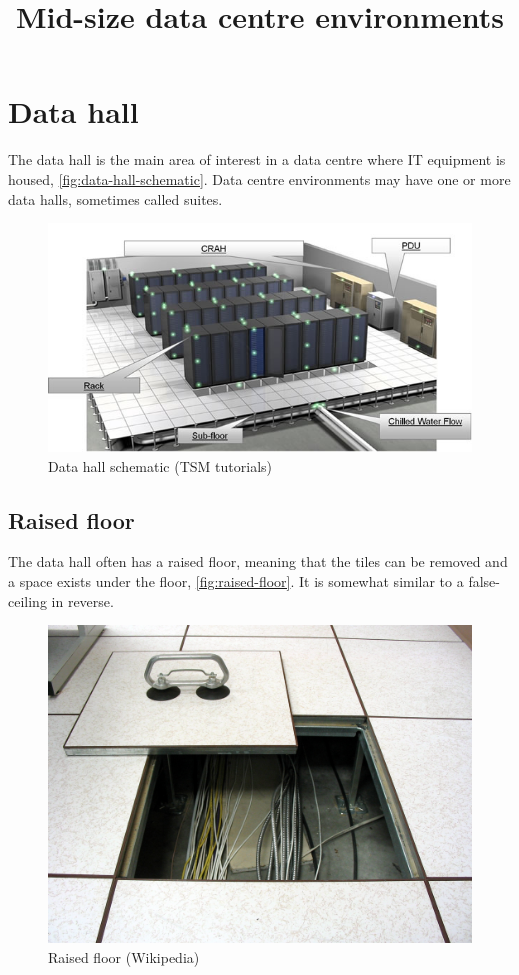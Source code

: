 \documentclass{pgnotes}
\title{Mid-size data centre environments}
\begin{document}
\maketitle

\section{Data hall}

The data hall is the main area of interest in a data centre where IT equipment is housed, \autoref{fig:data-hall-schematic}.
Data centre environments may have one or more data halls, sometimes called suites.

\begin{figure}[htbp]
  \centering
  \includegraphics[width=1.0\linewidth]{data_hall}
  \caption{Data hall schematic (TSM tutorials)}
  \label{fig:data-hall-schematic}
\end{figure}

\subsection{Raised floor}

The data hall often has a raised floor, meaning that the tiles can be removed and a space exists under the floor, \autoref{fig:raised-floor}.
It is somewhat similar to a false-ceiling in reverse.

\begin{figure}[htbp]
  \centering
  \includegraphics[width=0.75\linewidth]{raised_floor_wikipedia}
  \caption{Raised floor (Wikipedia)}
  \label{fig:raised-floor}
\end{figure}
\end{document}

